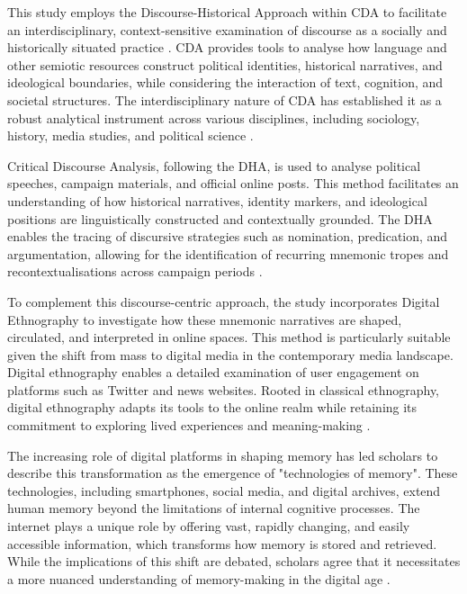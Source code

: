  This study employs the Discourse-Historical Approach within CDA  to facilitate an interdisciplinary, context-sensitive examination of discourse as a socially and historically situated practice  \linebreak\citep{reisigl_discourse_2001}. CDA provides tools to analyse how language and other semiotic resources construct political identities, historical narratives, and ideological boundaries, while considering the interaction of text, cognition, and societal structures. The interdisciplinary nature of CDA has established it as a robust analytical instrument across various disciplines, including sociology, history, media studies, and political science \citep{weiss_critical_2003}.

 Critical Discourse Analysis, following the DHA, is used to analyse political speeches, campaign materials, and official online posts. This method facilitates an understanding of how historical narratives, identity markers, and ideological positions are linguistically constructed and contextually grounded. The DHA enables the tracing of discursive strategies such as nomination, predication, and argumentation, allowing for the identification of recurring mnemonic tropes and recontextualisations across campaign periods \citep{reisigl_discourse_2001}.

To complement this discourse-centric approach, the study incorporates Digital Ethnography to investigate how these mnemonic narratives are shaped, circulated, and interpreted in online spaces. This method is particularly suitable given the shift from mass to digital media in the contemporary media landscape. Digital ethnography enables a detailed examination of user engagement on platforms such as Twitter and news websites. Rooted in classical ethnography, digital ethnography adapts its tools to the online realm while retaining its commitment to exploring lived experiences and meaning-making \citep{matthes_digital_2017}.

The increasing role of digital platforms in shaping memory has led scholars to describe this transformation as the emergence of "technologies of memory". These technologies, including smartphones, social media, and digital archives, extend human memory beyond the limitations of internal cognitive processes. The internet plays a unique role by offering vast, rapidly changing, and easily accessible information, which transforms how memory is stored and retrieved. While the implications of this shift are debated, scholars agree that it necessitates a more nuanced understanding of memory-making in the digital age \citep{van_house_technologies_2008}.


